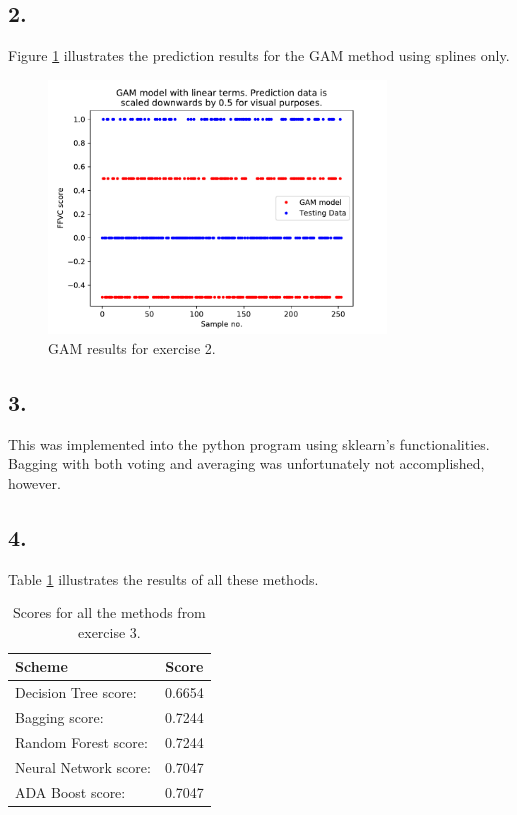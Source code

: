 \documentclass[]{article}
\begin{document}
\subsection*{2.}
Figure \ref{fig:GAMRES} illustrates the prediction results for the GAM method using splines only. 
\begin{figure}[H]
	\centering
	\includegraphics[width=0.8\textwidth]{figures/GAM_RESULTS.pdf}
	\caption{GAM results for exercise 2.}
	\label{fig:GAMRES}
\end{figure}

\subsection*{3.}
This was implemented into the python program using sklearn's functionalities. Bagging with both voting and averaging was unfortunately not accomplished, however.

\subsection*{4.}
Table \ref{tab:ALMOST} illustrates the results of all these methods.
\begin{table}[H]
	\centering
	\caption{Scores for all the methods from exercise 3.}
	\begin{tabular}[t]{l@{\hskip 0.5in}c}
		\toprule
		Scheme & Score \\
		\midrule
		Decision Tree score:&	 0.6654\\
		Bagging score:  	 &0.7244\\
		Random Forest score:&	 0.7244\\
		Neural Network score:&	 0.7047\\
		ADA Boost score:	 &0.7047\\
		\bottomrule
	\end{tabular}
	\label{tab:ALMOST}
\end{table}
\end{document}

